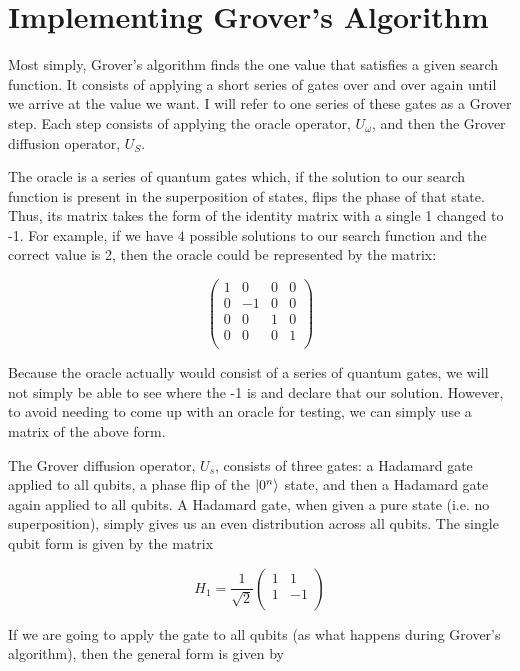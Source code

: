 \documentclass[11pt]{report}
\newcommand{\?}{\stackrel{?}{=}}
\begin{document}
\section{Implementing Grover's Algorithm}

Most simply, Grover's algorithm finds the one value that satisfies a given search function. It consists of applying a short series of gates over and over again until we arrive at the value we want. I will refer to one series of these gates as a Grover step. Each step consists of applying the oracle operator, $U_{\omega}$, and then the Grover diffusion operator, $U_{S}$.

The oracle is a series of quantum gates which, if the solution to our search function is present in the superposition of states, flips the phase of that state. Thus, its matrix takes the form of the identity matrix with a single 1 changed to -1. For example, if we have $4$ possible solutions to our search function and the correct value is 2, then the oracle could be represented by the matrix:

$$\begin{pmatrix}
1 & 0 & 0 & 0 \\
0 & -1 & 0 & 0 \\
0 & 0 & 1 & 0 \\
0 & 0 & 0 & 1 \\
\end{pmatrix}$$

Because the oracle actually would consist of a series of quantum gates, we will not simply be able to see where the -1 is and declare that our solution. However, to avoid needing to come up with an oracle for testing, we can simply use a matrix of the above form.

The Grover diffusion operator, $U_{s}$, consists of three gates: a Hadamard gate applied to all qubits, a phase flip of the $\ket{0^n}$ state, and then a Hadamard gate again applied to all qubits. A Hadamard gate, when given a pure state (i.e. no superposition), simply gives us an even distribution across all qubits. The single qubit form is given by the matrix

$$H_{1}=\frac{1}{\sqrt{2}} \begin{pmatrix}
1 & 1 \\
1 & -1 \\
\end{pmatrix}$$

If we are going to apply the gate to all qubits (as what happens during Grover's algorithm), then the general form is given by
\end{document}
